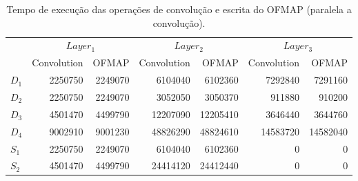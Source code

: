 \begin{table}[ht!]
\centering
\caption{Tempo de execução das operações de convolução e escrita do OFMAP (paralela a convolução).}
\label{tab:5-dnn-layer}
\begin{tabular}{lrrrrrr}
\toprule
 & \multicolumn{2}{c}{$Layer_1$} & \multicolumn{2}{c}{$Layer_2$} & \multicolumn{2}{c}{$Layer_3$} \\
\cmidrule(r){2-3} \cmidrule(lr){4-5} \cmidrule(l){6-7}
 & Convolution & OFMAP & Convolution & OFMAP & Convolution & OFMAP \\
\midrule
$D_1$ & 2250750 & 2249070 & 6104040 & 6102360 & 7292840 & 7291160 \\
$D_2$ & 2250750 & 2249070 & 3052050 & 3050370 & 911880 & 910200 \\
$D_3$ & 4501470 & 4499790 & 12207090 & 12205410 & 3646440 & 3644760 \\
$D_4$ & 9002910 & 9001230 & 48826290 & 48824610 & 14583720 & 14582040 \\
$S_1$ & 2250750 & 2249070 & 6104040 & 6102360 & 0 & 0 \\
$S_2$ & 4501470 & 4499790 & 24414120 & 24412440 & 0 & 0 \\
\bottomrule
\end{tabular}
\end{table}